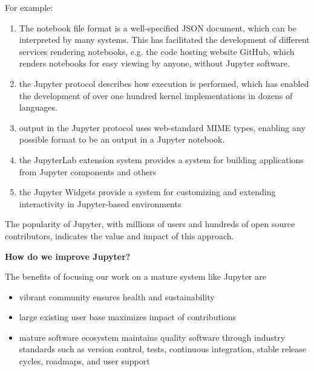 For example:

\begin{enumerate}
\item The notebook file format is a well-specified JSON document,
  which can be interpreted by many systems.  This has facilitated the
  development of different services rendering notebooks, e.g. the code
  hosting website GitHub, which renders notebooks for easy viewing by
  anyone, without Jupyter software.
\item the Jupyter protocol describes how execution is performed, which
  has enabled the development of over one hundred kernel
  implementations in dozens of languages.
\item output in the Jupyter protocol uses web-standard MIME types,
  enabling any possible format to be an output in a Jupyter notebook.
\item the JupyterLab extension system provides a system for building
  applications from Jupyter components and others
\item the Jupyter Widgets provide a system for customizing and
  extending interactivity in Jupyter-based environments
\end{enumerate}

The popularity of Jupyter, with millions of users and hundreds of open
source contributors, indicates the value and impact of this approach.

\textbf{How do we improve Jupyter?}

The benefits of focusing our work on a mature system like Jupyter are

\begin{itemize}
\item vibrant community ensures health and sustainability
\item large existing user base maximizes impact of contributions
\item mature software ecosystem maintains quality software through
  industry standards such as version control, tests, continuous
  integration, stable release cycles, roadmaps, and user support
\end{itemize}

